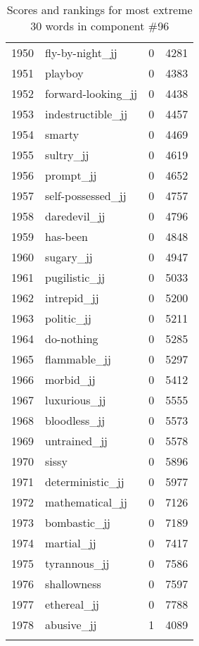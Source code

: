 \begin{longtable}[!htbp]{| rlr@{.}l |}
    1950 & fly-by-night\_jj & 0 & 4281 \\
    1951 & playboy & 0 & 4383 \\
    1952 & forward-looking\_jj & 0 & 4438 \\
    1953 & indestructible\_jj & 0 & 4457 \\
    1954 & smarty & 0 & 4469 \\
    1955 & sultry\_jj & 0 & 4619 \\
    1956 & prompt\_jj & 0 & 4652 \\
    1957 & self-possessed\_jj & 0 & 4757 \\
    1958 & daredevil\_jj & 0 & 4796 \\
    1959 & has-been & 0 & 4848 \\
    1960 & sugary\_jj & 0 & 4947 \\
    1961 & pugilistic\_jj & 0 & 5033 \\
    1962 & intrepid\_jj & 0 & 5200 \\
    1963 & politic\_jj & 0 & 5211 \\
    1964 & do-nothing & 0 & 5285 \\
    1965 & flammable\_jj & 0 & 5297 \\
    1966 & morbid\_jj & 0 & 5412 \\
    1967 & luxurious\_jj & 0 & 5555 \\
    1968 & bloodless\_jj & 0 & 5573 \\
    1969 & untrained\_jj & 0 & 5578 \\
    1970 & sissy & 0 & 5896 \\
    1971 & deterministic\_jj & 0 & 5977 \\
    1972 & mathematical\_jj & 0 & 7126 \\
    1973 & bombastic\_jj & 0 & 7189 \\
    1974 & martial\_jj & 0 & 7417 \\
    1975 & tyrannous\_jj & 0 & 7586 \\
    1976 & shallowness & 0 & 7597 \\
    1977 & ethereal\_jj & 0 & 7788 \\
    1978 & abusive\_jj & 1 & 4089 \\
    \hline
    \caption{Scores and rankings for most extreme 30 words in component \#96} \\
\end{longtable}
